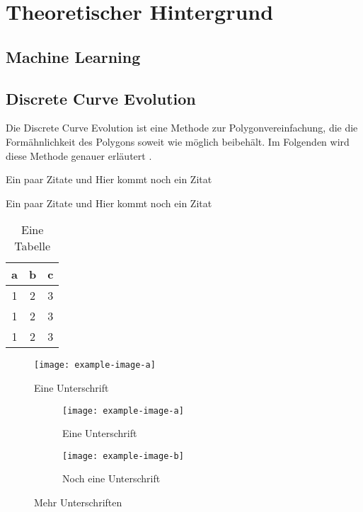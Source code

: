 \chapter{Theoretischer Hintergrund}
\label{ch:Theoretischer Hintergrund}

\blindtext

\section{Machine Learning}
\section{Discrete Curve Evolution}
{Die \glqq Discrete Curve Evolution\grqq{} \cite{Latecki1999a,Latecki1999c} ist eine Methode zur Polygonvereinfachung, die die Formähnlichkeit des Polygons soweit wie möglich beibehält. Im Folgenden wird diese Methode genauer erläutert \citep{Barkowsky2000}. \\  }

\blindtext

Ein paar Zitate \cite{Hartley2004} und \cite{Bishop2006} Hier kommt noch ein Zitat 
\cite{DorrChristopherH.2015SSBo}


\blindmathpaper


Ein paar Zitate \cite{Hartley2004} und \cite{Bishop2006} Hier kommt noch ein Zitat 
\cite{DorrChristopherH.2015SSBo}

\begin{table}[ht]
	\centering
	\begin{tabular}{c|c|c}
		a & b & c \\ \hline
		1 & 2 & 3 \\
		1 & 2 & 3 \\
		1 & 2 & 3
	\end{tabular}
	\caption{Eine Tabelle}
\end{table}

\begin{figure}[ht]
	\centering
	\texttt{[image: example-image-a]}
	\caption{Eine Unterschrift}
\end{figure}

\begin{figure}[ht]
	\centering
	\begin{subfigure}[b]{0.45\textwidth}
		\texttt{[image: example-image-a]}
		\caption{Eine Unterschrift}
	\end{subfigure} \hfill
	\begin{subfigure}[b]{0.45\textwidth}
		\texttt{[image: example-image-b]}
		\caption{Noch eine Unterschrift}
	\end{subfigure}
	\caption{Mehr Unterschriften}
\end{figure}




